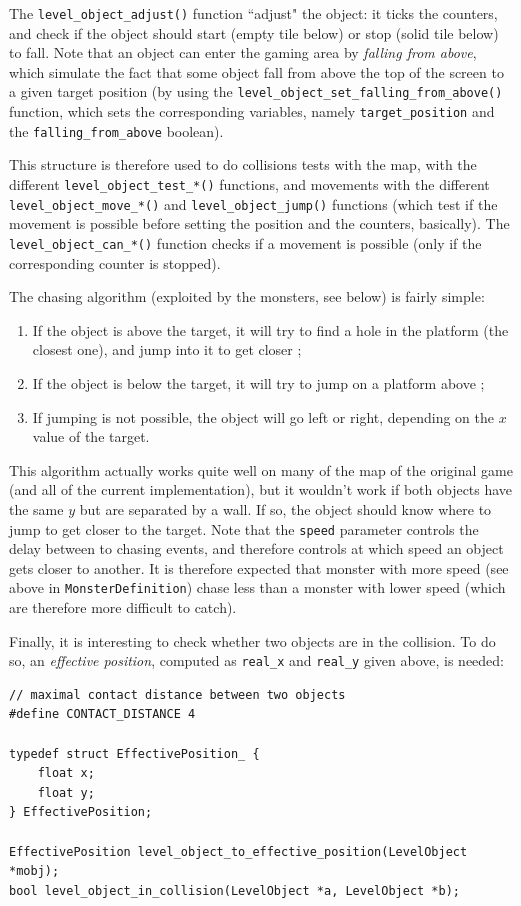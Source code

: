 \documentclass[12pt,a4paper]{article}
\newcommand{\cc}[1]{\texttt{#1}}
\begin{document}
The \cc{level_object_adjust()} function ``adjust" the object: it ticks the counters, and check if the object should start (empty tile below) or stop (solid tile below) to fall. Note that an object can enter the gaming area by \textit{falling from above}, which simulate the fact that some object fall from above the top of the screen to a given target position (by using the \cc{level_object_set_falling_from_above()} function, which sets the corresponding variables, namely \cc{target_position} and the \cc{falling_from_above} boolean).

This structure is therefore used to do collisions tests with the map, with the different \cc{level_object_test_*()} functions, and movements with the different \cc{level_object_move_*()} and \cc{level_object_jump()} functions (which test if the movement is possible before setting the position and the counters, basically). The \cc{level_object_can_*()} function checks if a movement is possible (only if the corresponding counter is stopped).

The chasing algorithm (exploited by the monsters, see below) is fairly simple:\begin{enumerate}
\item If the object is above the target, it will try to find a hole in the platform (the closest one), and jump into it to get closer ;
\item If the object is below the target, it will try to jump on a platform above ;
\item If jumping is not possible, the object will go left or right, depending on the $x$ value of the target.
\end{enumerate}
This algorithm actually works quite well on many of the map of the original game (and all of the current implementation), but it wouldn't work if both objects have the same $y$ but are separated by a wall. If so, the object should know where to jump to get closer to the target. Note that the \cc{speed} parameter controls the delay between to chasing events, and therefore controls at which speed an object gets closer to another. It is therefore expected that monster with more speed (see above in \cc{MonsterDefinition}) chase less than a monster with lower speed (which are therefore more difficult to catch).

Finally, it is interesting to check whether two objects are in the collision. To do so, an \textit{effective position}, computed as \cc{real_x} and \cc{real_y} given above, is needed:
\begin{verbatim}
// maximal contact distance between two objects
#define CONTACT_DISTANCE 4

typedef struct EffectivePosition_ {
	float x;
	float y;
} EffectivePosition;

EffectivePosition level_object_to_effective_position(LevelObject *mobj);
bool level_object_in_collision(LevelObject *a, LevelObject *b);
\end{verbatim}
\end{document}

